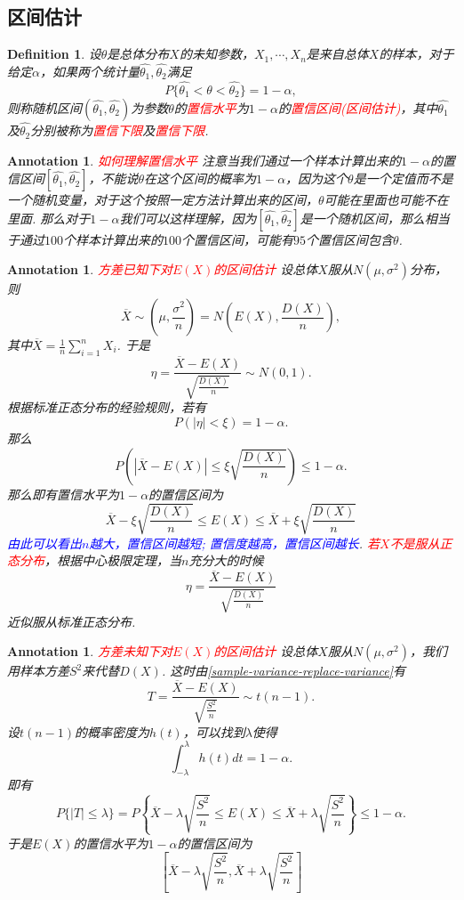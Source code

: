 \documentclass{article}
\newtheorem{definition}[theorem]{Definition}
\newtheorem{annotation}[theorem]{Annotation}
\newcommand{\redt}[1]{\textcolor{red}{#1}}
\newcommand{\bluet}[1]{\textcolor{blue}{#1}}
\begin{document}
\subsection{区间估计}

\begin{definition}
\rm 设$\theta$是总体分布$X$的未知参数，$X_1,\cdots,X_n$是来自总体$X$的样本，对于给定$\alpha$，如果两个统计量$\widehat{\theta_1},\widehat{\theta_2}$满足
$$
P\{\widehat{\theta_1} < \theta < \widehat{\theta_2}\} = 1-\alpha,
$$
则称随机区间$(\widehat{\theta_1},\widehat{\theta_2})$为参数$\theta$的\redt{置信水平}为$1-\alpha$的\redt{置信区间(区间估计)}，其中$\widehat{\theta_1}$及$\widehat{\theta_2}$分别被称为\redt{置信下限}及\redt{置信下限}. 
\end{definition}

\begin{annotation}
\rm \redt{如何理解置信水平} 注意当我们通过一个样本计算出来的$1-\alpha$的置信区间$[\widehat{\theta_1},\widehat{\theta_2}]$，不能说$\theta$在这个区间的概率为$1-\alpha$，因为这个$\theta$是一个定值而不是一个随机变量，对于这个按照一定方法计算出来的区间，$\theta$可能在里面也可能不在里面. 那么对于$1-\alpha$我们可以这样理解，因为$[\widehat{\theta_1},\widehat{\theta_2}]$是一个随机区间，那么相当于通过$100$个样本计算出来的$100$个置信区间，可能有$95$个置信区间包含$\theta$. 
\end{annotation}

\begin{annotation}
\rm \redt{方差已知下对$E(X)$的区间估计} 设总体$X$服从$N(\mu,\sigma^2)$分布，则
$$
\overline{X} \sim \left(\mu, \frac{\sigma^2}{n}\right) = N\left(E(X),\frac{D(X)}{n}\right),
$$
其中$\overline{X}= \frac{1}{n}\sum\limits_{i=1}^n X_i$. 于是
$$
\eta = \frac{\overline{X}-E(X)}{\sqrt{\frac{D(X)}{n}}} \sim N(0,1). 
$$
根据标准正态分布的经验规则，若有
$$
P\left(|\eta| < \xi\right) = 1-\alpha.   
$$
那么
$$
P\left( |\overline{X}-E(X)| \leq \xi \sqrt{\frac{D(X)}{n}}   \right) \leq 1-\alpha.
$$
那么即有置信水平为$1-\alpha$的置信区间为
$$
\overline{X} - \xi \sqrt{\frac{D(X)}{n}} \leq E(X) \leq  \overline{X} + \xi \sqrt{\frac{D(X)}{n}}
$$
\bluet{由此可以看出$n$越大，置信区间越短; 置信度越高，置信区间越长}. \redt{若$X$不是服从正态分布}，根据中心极限定理，当$n$充分大的时候
$$
\eta = \frac{\overline{X}-E(X)}{\sqrt{\frac{D(X)}{n}}}
$$
近似服从标准正态分布. 
\end{annotation}

\begin{annotation}
\rm \redt{方差未知下对$E(X)$的区间估计} 设总体$X$服从$N(\mu,\sigma^2)$，我们用样本方差$S^2$来代替$D(X)$. 这时由\ref{sample-variance-replace-variance}有
$$
T=\frac{\overline{X}-E(X)}{\sqrt{\frac{S^2}{n}}} \sim t(n-1).
$$
设$t(n-1)$的概率密度为$h(t)$，可以找到$\lambda$使得
$$
\int_{-\lambda}^{\lambda} h(t)dt = 1-\alpha.
$$
即有
$$
P\{|T| \leq \lambda \} = P\left\{ \overline{X} - \lambda \sqrt{\frac{S^2}{n}} \leq E(X) \leq  \overline{X} + \lambda \sqrt{\frac{S^2}{n}} \right\} \leq 1-\alpha.
$$
于是$E(X)$的置信水平为$1-\alpha$的置信区间为
$$
\left[ \overline{X} - \lambda \sqrt{\frac{S^2}{n}} ,  \overline{X} + \lambda \sqrt{\frac{S^2}{n}} \right]
$$
\end{annotation}
\end{document}
